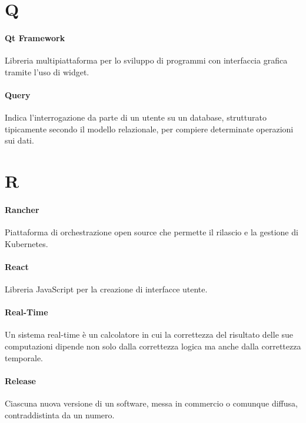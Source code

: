 \documentclass[]{article}
\begin{document}
	\newpage

	\section*{Q}

	\paragraph*{Qt Framework}
	Libreria multipiattaforma per lo sviluppo di programmi con interfaccia grafica tramite l'uso di widget.

	\paragraph*{Query}
	Indica l'interrogazione da parte di un utente su un database, strutturato tipicamente secondo il modello relazionale, per compiere determinate operazioni sui dati.

	\newpage

	\section*{R}

	\paragraph*{Rancher}
	Piattaforma di orchestrazione open source che permette il rilascio e la gestione di Kubernetes.

	\paragraph*{React}
	Libreria JavaScript per la creazione di interfacce utente.

	\paragraph*{Real-Time}
	Un sistema real-time è un calcolatore in cui la correttezza del risultato delle sue computazioni dipende non solo dalla correttezza logica ma anche dalla correttezza temporale.

	\paragraph*{Release}
	Ciascuna nuova versione di un software, messa in commercio o comunque diffusa, contraddistinta da un numero.
\end{document}
